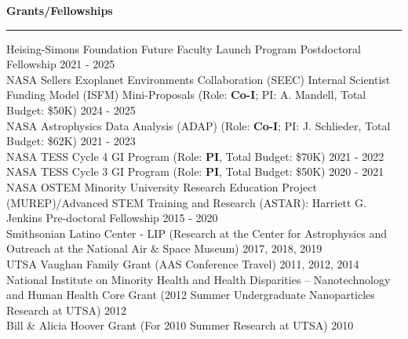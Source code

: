 \documentclass[12pt]{article}
\begin{document}
\noindent
{\bf Grants/Fellowships} \\
\vspace{-10mm}
\begin{center}
\rule{\textwidth}{0.2mm}
\end{center}
\vspace{-3mm}
\noindent
Heising-Simons Foundation Future Faculty Launch Program Postdoctoral Fellowship \hfill 2021 - 2025 \\
NASA Sellers Exoplanet Environments Collaboration (SEEC) Internal Scientist Funding Model (ISFM) Mini-Proposals (Role: \textbf{Co-I}; PI: A. Mandell, Total Budget: \$50K)  \hfill 2024 - 2025 \\ 
NASA Astrophysics Data Analysis (ADAP) (Role: \textbf{Co-I}; PI: J. Schlieder, Total Budget:  \$62K) \hfill 2021 - 2023 \\
NASA TESS Cycle 4 GI Program (Role: {\bf PI}, Total Budget: \$70K) \hfill 2021 - 2022 \\
NASA TESS Cycle 3 GI Program (Role: {\bf PI}, Total Budget: \$50K) \hfill 2020 - 2021 \\
NASA OSTEM Minority University Research Education Project (MUREP)/Advanced STEM Training and Research (ASTAR): Harriett G. Jenkins Pre-doctoral Fellowship \hfill 2015 - 2020 \\
Smithsonian Latino Center - LIP (Research at the Center for Astrophysics and Outreach at the National Air \& Space Museum) \hfill 2017, 2018, 2019 \\
UTSA Vaughan Family Grant (AAS Conference Travel) \hfill 2011, 2012, 2014 \\
National Institute on Minority Health and Health Disparities – Nanotechnology and Human Health Core Grant (2012 Summer Undergraduate Nanoparticles Research at UTSA) \hfill 2012 \\
Bill \& Alicia Hoover Grant (For 2010 Summer Research at UTSA) \hfill 2010 \\
\end{document}
